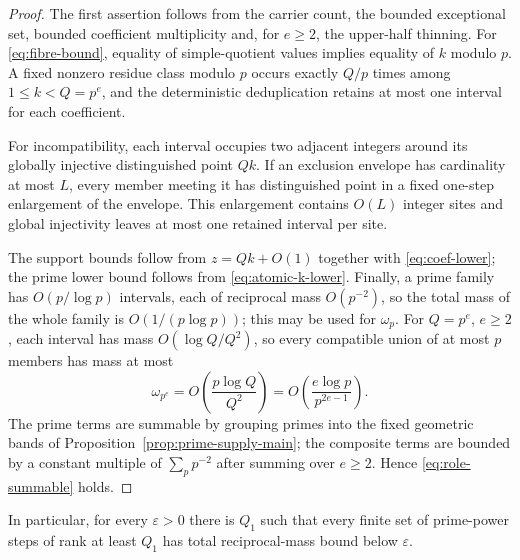 \begin{proof}
The first assertion follows from the carrier count, the bounded exceptional set, bounded coefficient multiplicity and, for $e\ge2$, the upper-half thinning.  For \eqref{eq:fibre-bound}, equality of simple-quotient values implies equality of $k$ modulo $p$.  A fixed nonzero residue class modulo $p$ occurs exactly $Q/p$ times among $1\le k<Q=p^e$, and the deterministic deduplication retains at most one interval for each coefficient.

For incompatibility, each interval occupies two adjacent integers around its globally injective distinguished point $Qk$.  If an exclusion envelope has cardinality at most $L$, every member meeting it has distinguished point in a fixed one-step enlargement of the envelope.  This enlargement contains $O(L)$ integer sites and global injectivity leaves at most one retained interval per site.

The support bounds follow from $z=Qk+O(1)$ together with \eqref{eq:coef-lower}; the prime lower bound follows from \eqref{eq:atomic-k-lower}.  Finally, a prime family has $O(p/\log p)$ intervals, each of reciprocal mass $O(p^{-2})$, so the total mass of the whole family is $O(1/(p\log p))$; this may be used for $\omega_p$.  For $Q=p^e$, $e\ge2$, each interval has mass $O(\log Q/Q^2)$, so every compatible union of at most $p$ members has mass at most
\[
\omega_{p^e}
=O\!\left(\frac{p\log Q}{Q^2}\right)
=O\!\left(\frac{e\log p}{p^{2e-1}}\right).
\]
The prime terms are summable by grouping primes into the fixed geometric bands of Proposition~\ref{prop:prime-supply-main}; the composite terms are bounded by a constant multiple of $\sum_p p^{-2}$ after summing over $e\ge2$.  Hence \eqref{eq:role-summable} holds.
\end{proof}

In particular, for every $\varepsilon>0$ there is $Q_1$ such that every finite set of prime-power steps of rank at least $Q_1$ has total reciprocal-mass bound below $\varepsilon$.
